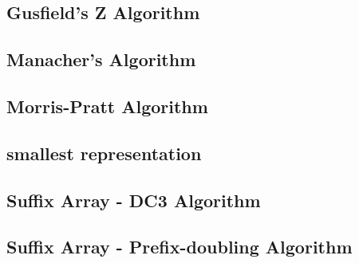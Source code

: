 \documentclass[a4paper,5pt,titlepage]{article}
\begin{document}
\subsection{Gusfield's Z Algorithm}

\subsection{Manacher's Algorithm}

\subsection{Morris-Pratt Algorithm}

\subsection{smallest representation}

\subsection{Suffix Array - DC3 Algorithm}

\subsection{Suffix Array - Prefix-doubling Algorithm}


\end{document}
